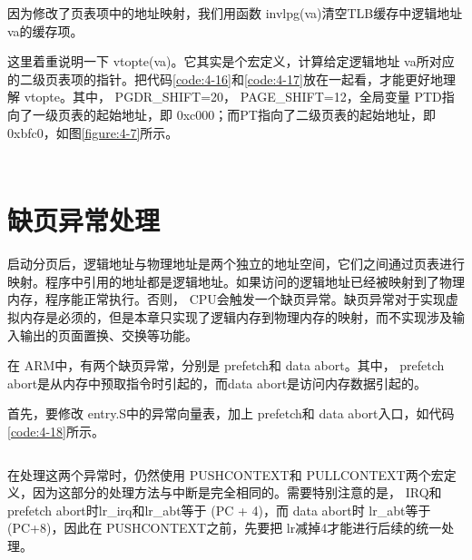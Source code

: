 \documentclass[main.tex]{subfiles}
\begin{document}
\begin{CJK*}{UTF8}{song}
\noindent
因为修改了页表项中的地址映射，我们用函数 invlpg(\-va\-)清空TLB缓存中逻辑地址 va的缓存项。

\par
这里着重说明一下 vtopte(va)。它其实是个宏定义，计算给定逻辑地址 va所对应的二级页表项的指针。把代码\ref{code:4-16}和\ref{code:4-17}放在一起看，才能更好地理解 vtopte。其中， PGDR\_\-SHIFT=20， PAGE\_\-SHIFT=12，全局变量 PTD指向了一级页表的起始地址，即 0xc000；而PT指向了二级页表的起始地址，即 0xbfc0，如图\ref{figure:4-7}所示。

\begin{code}
\label{code:4-16}
\inputminted[firstline=38,lastline=48,linenos,numbersep=5pt,frame=lines,framesep=2mm]{c}{src/chapter04/kernel/kernel.h}
\end{code}

\begin{code}
\label{code:4-17}
\inputminted[firstline=13,lastline=14,linenos,numbersep=5pt,frame=lines,framesep=2mm]{c}{src/chapter04/kernel/kernel.c}
\end{code}

\section{缺页异常处理}\label{section:page-fault}
启动分页后，逻辑地址与物理地址是两个独立的地址空间，它们之间通过页表进行映射。程序中引用的地址都是逻辑地址。如果访问的逻辑地址已经被映射到了物理内存，程序能正常执行。否则， CPU会触发一个缺页异常。缺页异常对于实现虚拟内存是必须的，但是本章只实现了逻辑内存到物理内存的映射，而不实现涉及输入输出的页面置换、交换等功能。

\par
在 ARM中，有两个缺页异常，分别是 pre\-fetch和 data abort。其中， pre\-fetch abort是从内存中预取指令时引起的，而data abort是访问内存数据引起的。

\par
首先，要修改 entry.S中的异常向量表，加上 pre\-fetch和 data abort入口，如代码\ref{code:4-18}所示。

\begin{code}
\label{code:4-18}
\inputminted[firstline=91,lastline=106,linenos,numbersep=5pt,frame=lines,framesep=2mm]{gas}{src/chapter04/kernel/entry.S}
\end{code}

在处理这两个异常时，仍然使用 PUSH\-CONTEXT和 PULL\-CONTEXT两个宏定义，因为这部分的处理方法与中断是完全相同的。需要特别注意的是， IRQ和 pre\-fetch abort时lr\_\-irq和lr\_\-abt等于 (PC + 4)，而 data abort时 lr\_\-abt等于 (PC+8)，因此在 PUSH\-CONTEXT之前，先要把 lr减掉4才能进行后续的统一处理。


\end{CJK*}
\end{document}
